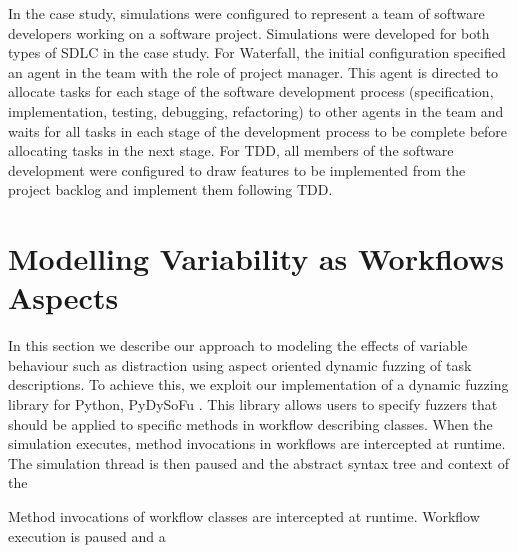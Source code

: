 \documentclass{llncs}
\begin{document}
In the case study, simulations were configured to represent a team of software developers working on a software
project. Simulations were developed for both types of SDLC in the case study.  For Waterfall, the initial configuration
specified an agent in the team with the role of project manager.  This agent is directed to allocate tasks for each
stage of the software development process (specification, implementation, testing, debugging, refactoring) to other
agents in the team and waits for all tasks in each stage of the development process to be complete before allocating
tasks in the next stage.  For TDD, all members of the software development were configured to draw features to be
implemented from the project backlog and implement them following TDD.


\section{Modelling Variability as Workflows Aspects}
\label{sec:fuzzing}


In this section we describe our approach to modeling the effects of variable behaviour such as distraction using aspect
oriented dynamic fuzzing of task descriptions.  To achieve this, we exploit our implementation of a dynamic fuzzing
library for Python, PyDySoFu \cite{storer2016pydysofu-scm}.  This library allows users to specify fuzzers that should be
applied to specific methods in workflow describing classes.  When the simulation executes, method invocations in
workflows are intercepted at runtime.  The simulation thread is then paused and the abstract syntax tree and context of the 

  Method invocations of workflow classes are intercepted at
runtime.  Workflow execution is paused and a
\end{document}
